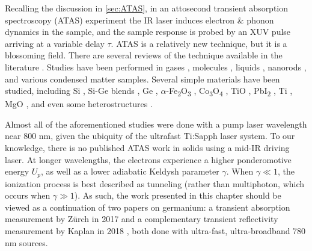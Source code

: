 Recalling the discussion in \cref{sec:ATAS}, in an attosecond transient absorption spectroscopy (ATAS) experiment the IR laser induces electron \& phonon dynamics in the sample, and the sample response is probed by an XUV pulse arriving at a variable delay $\tau$. ATAS is a relatively new technique, but it is a blossoming field. There are several reviews of the technique available in the literature \cite{beckProbingUltrafastDynamics2015,leoneWhatWillIt2014,changAttosecondOpticsTechnology2016,ramaseshaRealTimeProbingElectron2016,geneauxTransientAbsorptionSpectroscopy2019}. Studies have been performed in gases \cite{goulielmakisRealtimeObservationValence2010,wangAttosecondTimeResolvedAutoionization2010,caoAttosecondTransientAbsorption2016,chewAttosecondTransientAbsorption2018,chenLightinducedStatesAttosecond2012,bellIntensityDependenceLightinduced2013,linStrongfieldInducedXUV2012,bernhardtHighspectralresolutionAttosecondAbsorption2014,liInvestigationCouplingMechanisms2015,beckAttosecondTransientAbsorption2014}, molecules \cite{hoslerCharacterizationVibrationalWave2013,attarCoretovalenceSpectroscopicDetection2014,warrickProbingDynamicsRydberg2016}, liquids \cite{ziemkiewiczFemtosecondTimeresolvedXUV2014}, nanorods \cite{porterPhotoexcitedSmallPolaron2018}, and various condensed matter samples. Several simple materials have been studied, including Si \cite{schultzeAttosecondBandgapDynamics2014,cushingDifferentiatingPhotoexcitedCarrier2019}, Si-Ge blends \cite{zurchUltrafastCarrierThermalization2017}, Ge \cite{zurchDirectSimultaneousObservation2017,kaplanFemtosecondTrackingCarrier2018}, $\alpha$-Fe\textsubscript{2}O\textsubscript{3} \cite{vura-weisFemtosecondEdgeSpectroscopy2013}, Co\textsubscript{3}O\textsubscript{4} \cite{jiangCharacterizationPhotoInducedCharge2014}, TiO \cite{vaidaFemtosecondExtremeUltraviolet2016}, PbI\textsubscript{2} \cite{linCarrierSpecificFemtosecondXUV2017}, Ti \cite{volkovAttosecondScreeningDynamics2019}, MgO \cite{geneauxAttosecondTimeDomainMeasurement2020}, and even some heterostructures \cite{marshUltrafastTimeresolvedExtreme2018,cushingLayerresolvedUltrafastExtreme2020}.

Almost all of the aforementioned studies were done with a pump laser wavelength near 800 nm, given the ubiquity of the ultrafast Ti:Sapph laser system. To our knowledge, there is no published ATAS work in solids using a mid-IR driving laser. At longer wavelengths, the electrons experience a higher ponderomotive energy $U_p$, as well as a lower adiabatic Keldysh parameter $\gamma$. When $\gamma \ll 1$, the ionization process is best described as tunneling (rather than multiphoton, which occurs when $\gamma \gg 1$). As such, the work presented in this chapter should be viewed as a continuation of two papers on germanium: a transient absorption measurement by Z\"{u}rch in 2017 \cite{zurchDirectSimultaneousObservation2017} and a complementary transient reflectivity measurement by Kaplan in 2018 \cite{kaplanFemtosecondTrackingCarrier2018}, both done with ultra-fast, ultra-broadband 780 nm sources.

